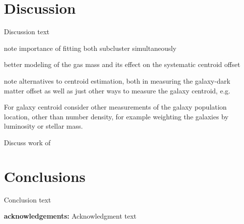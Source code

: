 \section{Discussion}

Discussion text

note importance of fitting both subcluster simultaneously

better modeling of the gas mass and its effect on the systematic centroid offset

note alternatives to centroid estimation, both in measuring the galaxy-dark matter offset as well as just other ways to measure the galaxy centroid, e.g. \citep{Randall:2008hs}

For galaxy centroid consider other measurements of the galaxy population location, other than number density, for example weighting the galaxies by luminosity or stellar mass.

Discuss work of \citep{Kahlhoefer:2013wp}



\section{Conclusions}

Conclusion text

\textbf{acknowledgements:}
Acknowledgment text

%



%
%  
